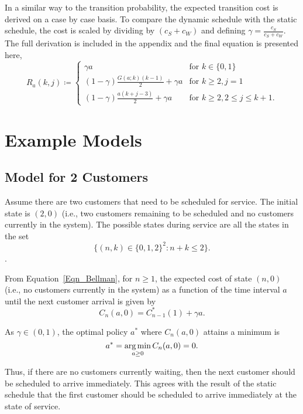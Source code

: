 In a similar way to the transition probability, the expected transition cost is derived on a case by case basis. To compare the dynamic schedule with the static schedule, the cost is scaled by dividing by $(c_{S} + c_{W})$ and defining $\gamma = \frac{c_{S}}{c_{S} + c_{W}}$. The full derivation is included in the appendix and the final equation is presented here,
\begin{equation}
	R_{a} (k, j) \coloneqq \begin{cases}
		\gamma a & \text{for $k \in \{ 0, 1 \}$} \\
		(1 - \gamma) \frac{G (a; k) (k - 1)}{2} + \gamma a & \text{for $k \geq 2, j = 1$} \\
		(1 - \gamma) \frac{a (k + j - 3)}{2} + \gamma a & \text{for $k \geq 2, 2 \leq j \leq k + 1$}.
	\end{cases}
\end{equation}

\section{Example Models}
\subsection{Model for 2 Customers}
Assume there are two customers that need to be scheduled for service. The initial state is $(2, 0)$ (i.e., two customers remaining to be scheduled and no customers currently in the system). The possible states during service are all the states in the set
\begin{equation}
	\Big\{ (n, k) \in \{ 0, 1, 2 \}^{2} : n + k \leq 2 \Big\}.
\end{equation}.

From Equation~\ref{Eqn_Bellman}, for $n \geq 1$, the expected cost of state $(n, 0)$ (i.e., no customers currently in the system) as a function of the time interval $a$ until the next customer arrival is given by
\begin{equation}
	C_{n} (a, 0) = C_{n - 1}^{*} (1) + \gamma a.
\end{equation}

As $\gamma \in (0, 1)$, the optimal policy $a^{*}$ where $C_{n} (a, 0)$ attains a minimum is
\begin{equation}
	a^{*} = \operatorname*{arg\,min}_{a \geq 0} C_{n} (a, 0) = 0.
	\label{eqn:Dynamic_No_Waiting}
\end{equation}

Thus, if there are no customers currently waiting, then the next customer should be scheduled to arrive immediately. This agrees with the result of the static schedule that the first customer should be scheduled to arrive immediately at the state of service.

